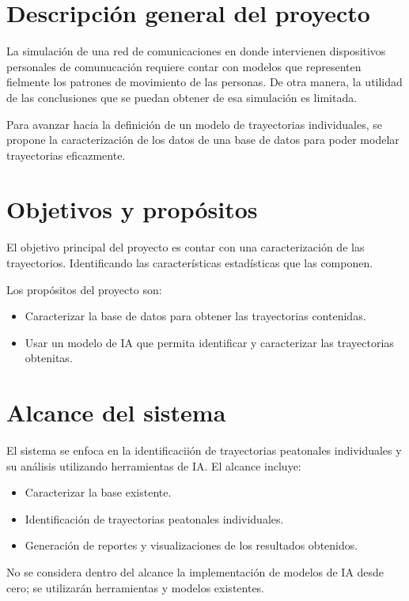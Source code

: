 \section{Descripción general del proyecto}
\label{sec:descripcion}

\noindent La simulaci\'on de una red de comunicaciones en donde intervienen dispositivos personales de comunucaci\'on requiere contar con modelos que representen fielmente los patrones de movimiento de las personas. De otra manera, la utilidad de las conclusiones que se puedan obtener de esa simulaci\'on es limitada. 

\noindent Para avanzar hacia la definici\'on de un modelo de trayectorias individuales, se propone la caracterización de los datos de una base de datos para poder modelar trayectorias eficazmente. 

\section{Objetivos y prop\'ositos}
\label{sec:objetivos}

\noindent El objetivo principal del proyecto es contar con una caracterizaci\'on de las trayectorios. Identificando las caracter\'isticas estad\'isticas que las componen.

\noindent Los prop\'ositos del proyecto son:
\begin{itemize}
    \item Caracterizar la base de datos para obtener las trayectorias contenidas.
    \item Usar un modelo de IA que permita identificar y caracterizar las trayectorias obtenitas.
\end{itemize}

\section{Alcance del sistema}
\label{sec:alcance}

\noindent El sistema se enfoca en la identificaciión de trayectorias peatonales individuales y su an\'alisis utilizando herramientas de IA. El alcance incluye:
\begin{itemize}
    \item Caracterizar la base existente.
    \item Identificación de trayectorias peatonales individuales.
    \item Generaci\'on de reportes y visualizaciones de los resultados obtenidos.
\end{itemize}
\noindent No se considera dentro del alcance la implementaci\'on de modelos de IA desde cero; se utilizar\'an herramientas y modelos existentes.